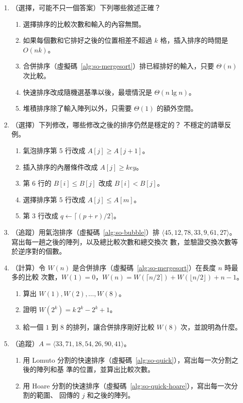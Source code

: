 \begin{enumerate}
\item （選擇，可能不只一個答案）下列哪些敘述正確？
\begin{enumerate}
\item 選擇排序的比較次數和輸入的內容無關。
\item 如果每個數和它排好之後的位置相差不超過 $k$ 格，插入排序的時間是 $O(nk)$。
\item 合併排序（虛擬碼~\ref{alg:so-mergesort}）排已經排好的輸入，只要 $\Theta(n)$ 次比較。
\item 快速排序改成隨機選基準以後，最壞情況是 $\Theta(n \lg n)$。
\item 堆積排序除了輸入陣列以外，只需要 $\Theta(1)$ 的額外空間。
\end{enumerate}

\item （選擇）下列修改，哪些修改之後的排序仍然是穩定的？ 不穩定的請舉反例。
\begin{enumerate}
\item 氣泡排序第 5 行改成 $A[j] \ge A[j+1]$。
\item 插入排序的內層條件改成 $A[j] \ge \mathit{key}$。
\item {} 第 6 行的 $B[i] \le B[j]$ 改成 $B[i] < B[j]$。
\item 選擇排序第 5 行改成 $A[j] \le A[m]$。
\item {} 第 3 行改成 $q \gets \lceil (p + r)/2 \rceil$。
\end{enumerate}

\item\label{so-q-bubble} （追蹤）用氣泡排序（虛擬碼~\ref{alg:so-bubble}）排
$\langle 45, 12, 78, 33, 9, 61, 27 \rangle$。 寫出每一趟之後的陣列，以及總比較次數和總交換次
數，並驗證交換次數等於逆序對的個數。

\item （計算）令 $W(n)$ 是合併排序（虛擬碼~\ref{alg:so-mergesort}）在長度 $n$ 時最多的比較
次數，$W(1) = 0$，$W(n) = W(\lceil n/2 \rceil) + W(\lfloor n/2 \rfloor) + n - 1$。
\begin{enumerate}
\item 算出 $W(1), W(2), \ldots, W(8)$。
\item 證明 $W(2^k) = k\,2^k - 2^k + 1$。
\item 給一個 $1$ 到 $8$ 的排列，讓合併排序剛好比較 $W(8)$ 次，並說明為什麼。
\end{enumerate}

\item （追蹤）$A = \langle 33, 71, 18, 54, 26, 90, 41 \rangle$。
\begin{enumerate}
\item 用 Lomuto 分割的快速排序（虛擬碼~\ref{alg:so-quick}），寫出每一次分割之後的陣列和基
準的位置，並算出比較次數。
\item 用 Hoare 分割的快速排序（虛擬碼~\ref{alg:so-quick-hoare}），寫出每一次分割的範圍、
回傳的 $j$ 和之後的陣列。
\end{enumerate}


\end{enumerate}
